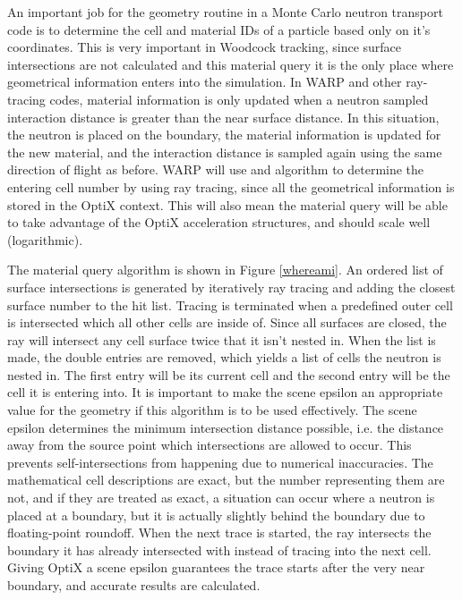 An important job for the geometry routine in a Monte Carlo neutron transport code is to determine the cell and material IDs of a particle based only on it's coordinates.  This is very important in Woodcock tracking, since surface intersections are not calculated and this material query it is the only place where geometrical information enters into the simulation.  In WARP and other ray-tracing codes, material information is only updated when a neutron sampled interaction distance is greater than the near surface distance.  In this situation, the neutron is placed on the boundary, the material information is updated for the new material, and the interaction distance is sampled again using the same direction of flight as before.  WARP will use and algorithm to determine the entering cell number by using ray tracing, since all the geometrical information is stored in the OptiX context.  This will also mean the material query will be able to take advantage of the OptiX acceleration structures, and should scale well (logarithmic).

The material query algorithm is shown in Figure \ref{whereami}.  An ordered list of surface intersections is generated by iteratively ray tracing and adding the closest surface number to the hit list.  Tracing is terminated when a predefined outer cell is intersected which all other cells are inside of.  Since all surfaces are closed, the ray will intersect any cell surface twice that it isn't nested in.  When the list is made, the double entries are removed, which yields a list of cells the neutron is nested in.  The first entry will be its current cell and the second entry will be the cell it is entering into.  It is important to make the scene epsilon an appropriate value for the geometry if this algorithm is to be used effectively.  The scene epsilon determines the minimum intersection distance possible, i.e. the distance away from the source point which intersections are allowed to occur.  This prevents self-intersections from happening due to numerical inaccuracies.  The mathematical cell descriptions are exact, but the number representing them are not, and if they are treated as exact, a situation can occur where a neutron is placed at a boundary, but it is actually slightly behind the boundary due to floating-point roundoff.  When the next trace is started, the ray intersects the boundary it has already intersected with instead of tracing into the next cell.  Giving OptiX a scene epsilon guarantees the trace starts after the very near boundary, and accurate results are calculated.

